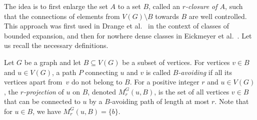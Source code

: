 The idea is to first enlarge the set $A$ to a set $B$, called
an \emph{$r$-closure of $A$}, such 
that the connections of elements from $V(G)\setminus B$ 
towards $B$ are well controlled. This approach
was first used in Drange et al.~\cite{drange2016kernelization} in the context of classes of bounded expansion, 
and then for nowhere dense classes in Eickmeyer et al.~\cite{eickmeyer2016neighborhood}. 
Let us recall the necessary definitions.

Let $G$ be a graph and let $B\subseteq V(G)$ be a subset of vertices. For vertices $v\in B$ and $u\in V(G)$, a path $P$ connecting $u$ and $v$ is called {\em{$B$-avoiding}}
if all its vertices apart from~$v$ do not belong to $B$. For a positive integer $r$ and $u\in V(G)$, the {\em{$r$-projection}} of $u$ on $B$, denoted $M^G_r(u,B)$, is the set of all vertices $v\in B$ that
can be connected to $u$ by a $B$-avoiding path of length at most $r$. Note that for $u\in B$, we have $M^G_r(u,B)=\{b\}$.
%
%

